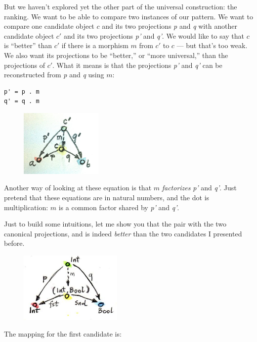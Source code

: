 But we haven't explored yet the other part of the universal
construction: the ranking. We want to be able to compare two instances
of our pattern. We want to compare one candidate object $c$ and its
two projections \emph{p} and \emph{q} with another candidate object
$c'$ and its two projections \emph{p'} and \emph{q'}. We would like
to say that $c$ is ``better'' than $c'$ if there is a morphism
$m$ from $c'$ to $c$ --- but that's too weak. We also
want its projections to be ``better,'' or ``more universal,'' than the
projections of $c'$. What it means is that the projections
\emph{p'} and \emph{q'} can be reconstructed from \emph{p} and \emph{q}
using $m$:

\begin{Verbatim}
p' = p . m
q' = q . m
\end{Verbatim}

\begin{figure}[H]
\centering
\includegraphics[width=40mm]{images/productranking.jpg}
\end{figure}

\noindent
Another way of looking at these equation is that $m$
\emph{factorizes} \emph{p'} and \emph{q'}. Just pretend that these
equations are in natural numbers, and the dot is multiplication:
$m$ is a common factor shared by \emph{p'} and \emph{q'}.

Just to build some intuitions, let me show you that the pair
 with the two canonical projections, 
and  is indeed \emph{better} than the two candidates I
presented before.

\begin{figure}[H]
\centering
\includegraphics[width=50mm]{images/not-a-product.jpg}
\end{figure}

\noindent
The mapping  for the first candidate is:

